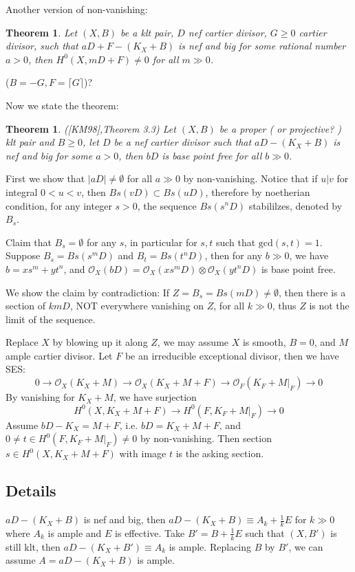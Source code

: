 \documentclass{article}
\newtheorem{thm}[defn]{Theorem}
\begin{document}
Another version of non-vanishing:
\begin{thm}
  Let $ (X,B) $ be a klt pair, $ D $ nef cartier divisor, $ G\geqslant0 $ cartier divisor, such that $ aD+F-(K_X+B) $ is nef and big for some rational number $ a>0 $, then $ H^0(X,mD+F)\neq 0 $ for all $ m\gg 0 $.
\end{thm}
($ B=-G, F=\lceil G\rceil $)?

Now we state the theorem:
\begin{thm}
  ([KM98],Theorem 3.3) Let $ (X,B) $ be a proper ( or projective? ) klt pair and $ B\geqslant 0 $, let $ D $ be a nef cartier divisor such that $ aD-(K_X+B) $ is nef and big for some $ a>0 $, then $ bD $ is base point free for all $ b\gg 0 $.
\end{thm}
First we show that $ |aD| \neq \emptyset $ for all $ a\gg 0 $ by non-vanishing. Notice that if $ u|v $ for integral $ 0<u<v $, then $ Bs(vD)\subset Bs(uD) $, therefore by noetherian condition, for any  integer $ s>0 $, the sequence $ Bs(s^nD) $ stabililzes, denoted by $ B_s $.

Claim that $ B_s=\emptyset $ for any $ s $, in particular for $ s,t $ such that $ \mathrm{gcd}(s,t)=1 $. Suppose $ B_s=Bs(s^mD) $ and $ B_t=Bs(t^nD) $, then for any $ b\gg 0$, we have $ b=xs^m+yt^n $, and $ \mathcal{O}_X(bD)=\mathcal{O}_X(xs^mD)\otimes\mathcal{O}_X(yt^nD) $ is base point free. 

We show the claim by contradiction: If $ Z=B_s=Bs(mD)\neq \emptyset $, then there is a section of $ kmD $, NOT everywhere vanishing on $ Z $, for all $ k\gg 0 $, thus $ Z $ is not the limit of the sequence. 


Replace $ X $ by blowing up it along $ Z $, we may assume $ X $ is smooth, $ B=0 $, and $ M $ ample cartier divisor. Let $ F $ be an irreducible exceptional divisor, then we have SES:
\[ 0\to \mathcal{O}_X(K_X+M)\to \mathcal{O}_X(K_X+M+F)\to \mathcal{O}_F(K_F+M|_F)\to 0 \]
By vanishing for $ K_X+M $, we have surjection
$$ H^0(X,K_X+M+F)\to H^0(F,K_F+M|_F)\to 0 $$  
Assume $ bD-K_X=M+F $, i.e. $ bD=K_X+M+F $, and $ 0\neq t\in H^0(F,K_F+M|_F)\neq 0 $ by non-vanishing. Then section $ s\in H^0(X,K_X+M+F) $ with image $ t $ is the asking section.
\subsection{Details}
$ aD-(K_X+B) $ is nef and big, then $ aD-(K_X+B)\equiv A_k+\frac{1}{k}E $ for $ k\gg 0 $ where $ A_k $ is ample and $ E $ is effective. Take $ B'=B+\frac{1}{k}E $ such that $ (X,B') $ is still klt, then  $ aD-(K_X+B')\equiv A_k $ is ample. Replacing $ B $ by $ B' $,  we can assume $ A=aD-(K_X+B) $ is ample. 
\end{document}
